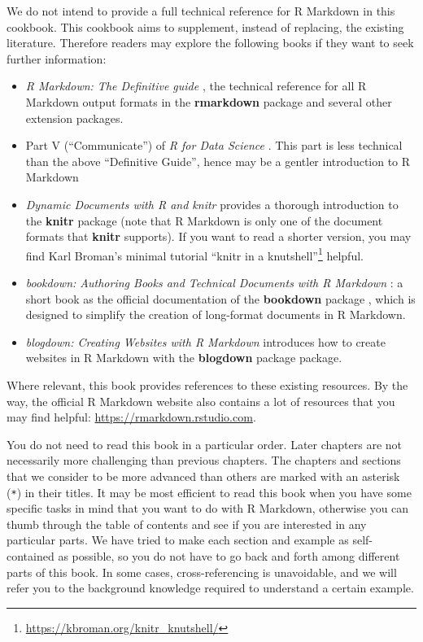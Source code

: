 \documentclass[
  11pt,
]{krantz}
\renewcommand{\href}[2]{#2\footnote{\url{#1}}}
\begin{document}
We do not intend to provide a full technical reference for R Markdown in this cookbook. This cookbook aims to supplement, instead of replacing, the existing literature. Therefore readers may explore the following books if they want to seek further information:

\begin{itemize}
\item
  \emph{R Markdown: The Definitive guide} \citep{rmarkdown2018}, the technical reference for all R Markdown output formats in the \textbf{rmarkdown} package and several other extension packages.
\item
  Part V (``Communicate'') of \emph{R for Data Science} \citep{wickham2016}. This part is less technical than the above ``Definitive Guide'', hence may be a gentler introduction to R Markdown
\item
  \emph{Dynamic Documents with R and knitr} \citep{knitr2015} provides a thorough introduction to the \textbf{knitr} package \citep{R-knitr} (note that R Markdown is only one of the document formats that \textbf{knitr} supports). If you want to read a shorter version, you may find Karl Broman's minimal tutorial \href{https://kbroman.org/knitr_knutshell/}{``knitr in a knutshell''} helpful.
\item
  \emph{bookdown: Authoring Books and Technical Documents with R Markdown} \citep{bookdown2016}: a short book as the official documentation of the \textbf{bookdown} package \citep{R-bookdown}, which is designed to simplify the creation of long-format documents in R Markdown.
\item
  \emph{blogdown: Creating Websites with R Markdown} \citep{blogdown2017} introduces how to create websites in R Markdown with the \textbf{blogdown} package \citep{R-blogdown} package.
\end{itemize}

Where relevant, this book provides references to these existing resources. By the way, the official R Markdown website also contains a lot of resources that you may find helpful: \url{https://rmarkdown.rstudio.com}.

You do not need to read this book in a particular order. Later chapters are not necessarily more challenging than previous chapters. The chapters and sections that we consider to be more advanced than others are marked with an asterisk (\texttt{*}) in their titles. It may be most efficient to read this book when you have some specific tasks in mind that you want to do with R Markdown, otherwise you can thumb through the table of contents and see if you are interested in any particular parts. We have tried to make each section and example as self-contained as possible, so you do not have to go back and forth among different parts of this book. In some cases, cross-referencing is unavoidable, and we will refer you to the background knowledge required to understand a certain example.
\end{document}
